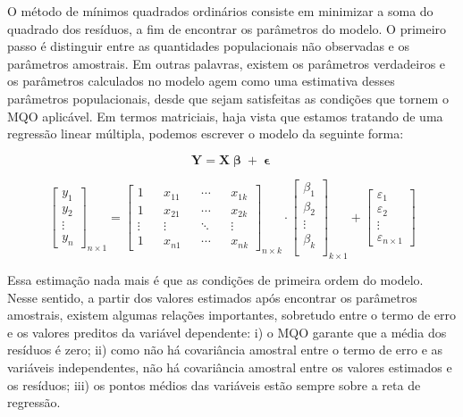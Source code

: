 \documentclass[a4paper,12pt]{article}
\begin{document}
O método de mínimos quadrados ordinários consiste em minimizar a soma do
quadrado dos resíduos, a fim de encontrar os parâmetros do modelo. O
primeiro passo é distinguir entre as quantidades populacionais não
observadas e os parâmetros amostrais. Em outras palavras, existem os
parâmetros verdadeiros e os parâmetros calculados no modelo agem como
uma estimativa desses parâmetros populacionais, desde que sejam
satisfeitas as condições que tornem o MQO aplicável. Em termos
matriciais, haja vista que estamos tratando de uma regressão linear
múltipla, podemos escrever o modelo da seguinte forma:

\begin{equation}
\textbf{Y} = \textbf{X} \mbfbeta + \mbfvarepsilon
\end{equation}

\begin{equation}
\begin{bmatrix}
y_1 \\
y_2 \\
\vdots \\
y_n
\end{bmatrix}_{n \times 1}
=
\begin{bmatrix}
1 && x_{11} && \cdots && x_{1k} \\
1 && x_{21} && \cdots && x_{2k} \\
\vdots && \vdots && \ddots && \vdots \\
1 && x_{n1} && \cdots && x_{nk}
\end{bmatrix}_{n \times k}
\cdot
\begin{bmatrix}
\beta_1 \\
\beta_2 \\
\vdots \\
\beta_k \\
\end{bmatrix}_{k \times 1}
+
\begin{bmatrix}
\varepsilon_1 \\
\varepsilon_2 \\
\vdots \\
\varepsilon_{n \times 1}
\end{bmatrix}
\end{equation}

Essa estimação nada mais é que as condições de primeira ordem do modelo.
Nesse sentido, a partir dos valores estimados após encontrar os
parâmetros amostrais, existem algumas relações importantes, sobretudo
entre o termo de erro e os valores preditos da variável dependente: i) o
MQO garante que a média dos resíduos é zero; ii) como não há covariância
amostral entre o termo de erro e as variáveis independentes, não há
covariância amostral entre os valores estimados e os resíduos; iii) os
pontos médios das variáveis estão sempre sobre a reta de regressão.
\end{document}
